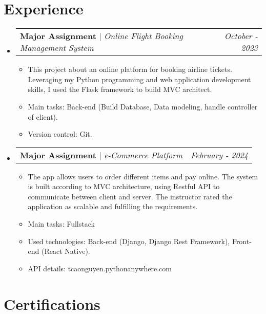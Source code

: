\documentclass[letterpaper,12pt]{article}
\makeatletter
\newcommand{\subheadingtitlevspace}{
\vspace{-3pt}
}
\newcommand{\resumeItem}[1]{
  \item{
    {#1 \vspace{-4pt}}
  }
}
\newcommand{\titleItem}[1]{
  \textbf{#1}
}
\newcommand{\resumeProjectHeading}[2]{
    \item
    \begin{tabular*}{0.97\textwidth}{l@{\extracolsep{\fill}}r}
      #1 & \textit{ #2} \\
    \end{tabular*}\vspace{-9pt}
}
\newcommand{\resumeSubHeadingListStart}{\subheadingtitlevspace\begin{itemize}[leftmargin=0.15in, label={}]}
\newcommand{\resumeSubHeadingListEnd}{\end{itemize}}
\newcommand{\resumeItemListStart}{
\begin{itemize}}
\newcommand{\resumeItemListEnd}{
\end{itemize}\vspace{-8pt}}
\makeatother
\begin{document}

\section{Experience}
\resumeSubHeadingListStart
\resumeProjectHeading
{\titleItem{{Major Assignment}} $|$ \emph{Online Flight Booking Management System}}{October - 2023}
\resumeItemListStart
\resumeItem{This project about an online platform for booking airline tickets. Leveraging my Python programming and web application development skills, I used the Flask framework to build MVC architect.}
\resumeItem{Main tasks: Back-end (Build Database, Data modeling, handle controller of client).}
\resumeItem{Version control: Git.}
\resumeItemListEnd

\resumeProjectHeading
{\titleItem{{Major Assignment}} $|$ \emph{e-Commerce Platform}}{February - 2024}
\resumeItemListStart
\resumeItem{
  The app allows users to order different items and pay online. The system is built according to MVC architecture, using Restful API to communicate between client and server. The instructor rated the application as scalable and fulfilling the requirements.}
\resumeItem{Main tasks: Fullstack}
\resumeItem{Used technologies: Back-end (Django, Django Rest Framework), Front-end (React Native). }
\resumeItem{API details: tcaonguyen.pythonanywhere.com }
\resumeItemListEnd
\resumeSubHeadingListEnd

\section{Certifications}
\end{document}
